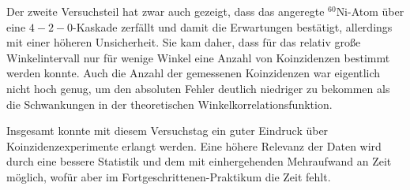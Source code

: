 \documentclass[11pt]{scrartcl}
\begin{document}
Der zweite Versuchsteil hat zwar auch gezeigt, dass das angeregte $^60$Ni-Atom über eine $4-2-0$-Kaskade
zerfällt und damit die Erwartungen bestätigt, allerdings mit einer höheren Unsicherheit. Sie kam
daher, dass für das relativ große Winkelintervall nur für wenige Winkel eine Anzahl von Koinzidenzen 
bestimmt werden konnte. Auch die Anzahl der gemessenen
Koinzidenzen war eigentlich nicht hoch genug, um den
absoluten Fehler deutlich niedriger zu bekommen als die Schwankungen in der theoretischen
Winkelkorrelationsfunktion.

Insgesamt konnte mit diesem Versuchstag ein guter Eindruck über Koinzidenzexperimente erlangt werden.
Eine höhere Relevanz der Daten wird durch eine bessere Statistik und dem mit einhergehenden Mehraufwand
an Zeit möglich, wofür aber im Fortgeschrittenen-Praktikum die Zeit fehlt.


\end{document}
